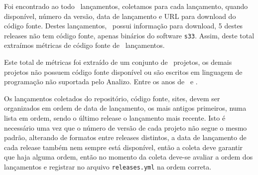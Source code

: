 Foi encontrado ao todo \ReleasesCount \ lançamentos, coletamos para cada
lançamento, quando disponível, número da versão, data de lançamento e URL para
download do código fonte. Destes lançamentos, \ReleasesAvailableCount \ possui
informação para download, 5 destes releases não tem código fonte, apenas
binários do software \texttt{s33}. Assim, deste total extraímos métricas
de código fonte de \ReleasesMetricsCount \ lançamentos.

Este total de métricas foi extraído de um conjunto de \ProjectsAnalizedCount \
projetos, os demais projetos não possuem código fonte disponível ou são
escritos em linguagem de programação não suportada pelo Analizo. Entre os anos
de \ReleasesYearFirst \ e \ReleasesYearLast.






Os lançamentos coletados do repositório, código fonte, sites, devem ser
organizados em ordem de data de lançamento, os mais antigos primeiros, numa
lista em ordem, sendo o último release o lançamento mais recente. Isto é
necessário uma vez que o número de versão de cada projeto não segue o mesmo
padrão, alterando de formatos entre releases distintos, a data de lançamento de
cada release também nem sempre está disponível, então a coleta deve garantir
que haja alguma ordem, então no momento da coleta deve-se avaliar a ordem dos
lançamentos e registrar no arquivo \texttt{releases.yml} na ordem correta.

